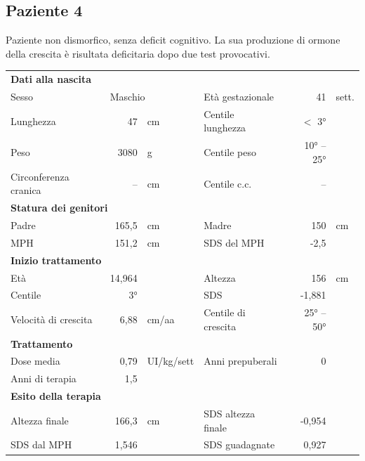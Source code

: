 \subsection*{Paziente 4}%

Paziente non dismorfico, senza deficit cognitivo. La sua produzione di ormone della crescita è risultata deficitaria dopo due test provocativi.

\begin{table}[!h]
\begin{tabular}{lrllrl}
\toprule
\multicolumn{6}{l}{\textbf{Dati alla nascita}}\\
Sesso 		& \multicolumn{2}{l}{Maschio} 	& Età gestazionale 		& 41 		& sett.\\
Lunghezza 	& 47 		& cm 				& Centile lunghezza		& $<$ 3° 	\\
Peso 		& 3080 		& g					& Centile peso			& 10° -- 25° 	\\
Circonferenza cranica	& -- 		& cm 	& Centile c.c.			& -- \\
\midrule
\multicolumn{6}{l}{\textbf{Statura dei genitori}}\\
Padre 		& 165,5 & cm 	& Madre 				& 150 & cm \\
MPH 		& 151,2 & cm 	& SDS del MPH 			& -2,5\\
\midrule
\multicolumn{6}{l}{\textbf{Inizio trattamento}} \\
Età	& 14,964 & 		& Altezza 				& 156 & cm  \\
Centile & 3° 	 &		& SDS		& -1,881 \\
Velocità di crescita & 6,88 & cm/aa	& Centile di crescita & 25° -- 50°\\
\midrule
\multicolumn{6}{l}{\textbf{Trattamento}} \\
Dose media		& 0,79 & UI/kg/sett & Anni prepuberali & 0\\
Anni di terapia & 1,5\\
\midrule
\multicolumn{6}{l}{\textbf{Esito della terapia}} \\
Altezza finale			& 166,3 & cm 	& SDS altezza finale		& -0,954\\
SDS dal MPH				& 1,546 &		& SDS guadagnate 			& 0,927\\
\bottomrule
\end{tabular}
\end{table}
\clearpage

